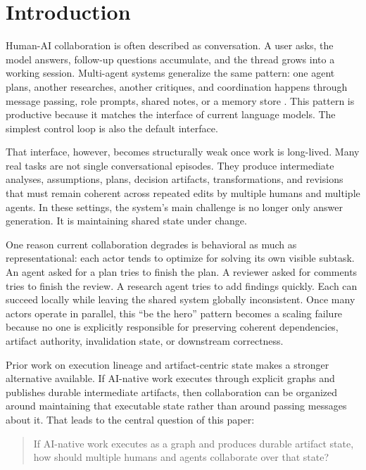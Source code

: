 \documentclass{article}
\begin{document}
\section{Introduction}

Human-AI collaboration is often described as conversation. A user asks, the model answers, follow-up questions accumulate, and the thread grows into a working session. Multi-agent systems generalize the same pattern: one agent plans, another researches, another critiques, and coordination happens through message passing, role prompts, shared notes, or a memory store \cite{yao2023react,li2023camel,wu2023autogen,hong2023metagpt}. This pattern is productive because it matches the interface of current language models. The simplest control loop is also the default interface.

That interface, however, becomes structurally weak once work is long-lived. Many real tasks are not single conversational episodes. They produce intermediate analyses, assumptions, plans, decision artifacts, transformations, and revisions that must remain coherent across repeated edits by multiple humans and multiple agents. In these settings, the system's main challenge is no longer only answer generation. It is maintaining shared state under change.

One reason current collaboration degrades is behavioral as much as representational: each actor tends to optimize for solving its own visible subtask. An agent asked for a plan tries to finish the plan. A reviewer asked for comments tries to finish the review. A research agent tries to add findings quickly. Each can succeed locally while leaving the shared system globally inconsistent. Once many actors operate in parallel, this ``be the hero'' pattern becomes a scaling failure because no one is explicitly responsible for preserving coherent dependencies, artifact authority, invalidation state, or downstream correctness.

Prior work on execution lineage and artifact-centric state makes a stronger alternative available. If AI-native work executes through explicit graphs and publishes durable intermediate artifacts, then collaboration can be organized around maintaining that executable state rather than around passing messages about it. That leads to the central question of this paper:
\begin{quote}
If AI-native work executes as a graph and produces durable artifact state, how should multiple humans and agents collaborate over that state?
\end{quote}
\end{document}
